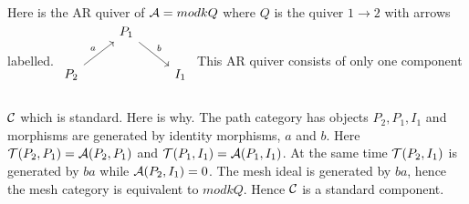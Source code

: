 \begin{example} Here is the AR quiver of $\mathcal{A} = mod kQ$ where $Q$ is the quiver $1\to 2$ with arrows labelled.
$\begin{tikzcd}
&P_1\arrow[rd,"b"] &\\
P_2\arrow[ru,"a"]& &I_1\\
\end{tikzcd}$ This AR quiver consists of only one component $\mathcal{C}$ which is standard. Here is why. The path category has objects $P_2, P_1, I_1$ and morphisms are generated by identity morphisms, $a$ and $b$. Here $\mathcal{T}(P_2,P_1) = \mathcal{A}(P_2, P_1)$ and $\mathcal{T}(P_1,I_1) = \mathcal{A}(P_1, I_1)$. At the same time $\mathcal{T}(P_2,I_1)$ is generated by $ba$ while $\mathcal{A}(P_2,I_1) = 0$. The mesh ideal is generated by $ba$, hence the mesh category is equivalent to $mod kQ$. Hence $\mathcal{C}$ is a standard component.
\end{example}
